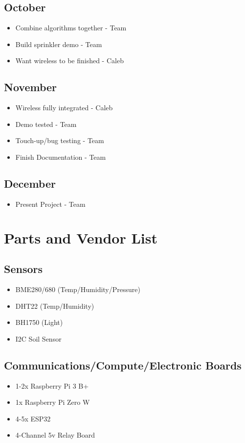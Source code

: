 \documentclass[letterpaper, 10 pt, conference]{ieeeconf}  %
\begin{document}
\subsection{October}
\begin{itemize}
    \item Combine algorithms together - Team
    \item Build sprinkler demo - Team
    \item Want wireless to be finished - Caleb
\end{itemize}

\subsection{November}
\begin{itemize}
    \item Wireless fully integrated - Caleb
    \item Demo tested - Team
    \item Touch-up/bug testing - Team
    \item Finish Documentation - Team
\end{itemize}

\subsection{December}
\begin{itemize}
    \item Present Project - Team
\end{itemize}

\section{Parts and Vendor List}
\subsection{Sensors}
\begin{itemize}
  \item BME280/680 (Temp/Humidity/Pressure)
  \item DHT22 (Temp/Humidity)
  \item BH1750 (Light)
  \item I2C Soil Sensor
\end{itemize}

\subsection{Communications/Compute/Electronic Boards}
\begin{itemize}
  \item 1-2x Raspberry Pi 3 B+
  \item 1x Raspberry Pi Zero W
  \item 4-5x ESP32
  \item 4-Channel 5v Relay Board
\end{itemize}
\end{document}
